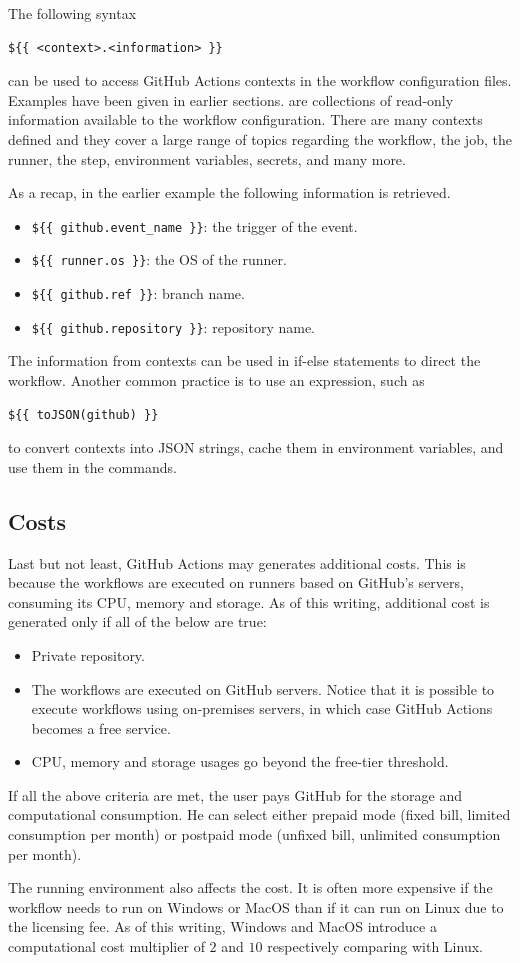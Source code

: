 The following syntax 
\begin{lstlisting}
${{ <context>.<information> }}
\end{lstlisting}
can be used to access GitHub Actions contexts in the workflow configuration files. Examples have been given in earlier sections.  are collections of read-only information available to the workflow configuration. There are many contexts defined and they cover a large range of topics regarding the workflow, the job, the runner, the step, environment variables, secrets, and many more.

As a recap, in the earlier example the following information is retrieved.
\begin{itemize}
  \item \verb|${{ github.event_name }}|: the trigger of the event.
  \item \verb|${{ runner.os }}|: the OS of the runner.
  \item \verb|${{ github.ref }}|: branch name.
  \item \verb|${{ github.repository }}|: repository name.
\end{itemize}

The information from contexts can be used in if-else statements to direct the workflow. Another common practice is to use an expression, such as
\begin{lstlisting}
${{ toJSON(github) }}
\end{lstlisting}
to convert contexts into JSON strings, cache them in environment variables, and use them in the commands.



\subsection{Costs}

Last but not least, GitHub Actions may generates additional costs. This is because the workflows are executed on runners based on GitHub's servers, consuming its CPU, memory and storage. As of this writing, additional cost is generated only if all of the below are true:
\begin{itemize}
	\item Private repository.
	\item The workflows are executed on GitHub servers. Notice that it is possible to execute workflows using on-premises servers, in which case GitHub Actions becomes a free service.
	\item CPU, memory and storage usages go beyond the free-tier threshold.
\end{itemize}

If all the above criteria are met, the user pays GitHub for the storage and computational consumption. He can select either prepaid mode (fixed bill, limited consumption per month) or postpaid mode (unfixed bill, unlimited consumption per month).

The running environment also affects the cost. It is often more expensive if the workflow needs to run on Windows or MacOS than if it can run on Linux due to the licensing fee. As of this writing, Windows and MacOS introduce a computational cost multiplier of $2$ and $10$ respectively comparing with Linux.
